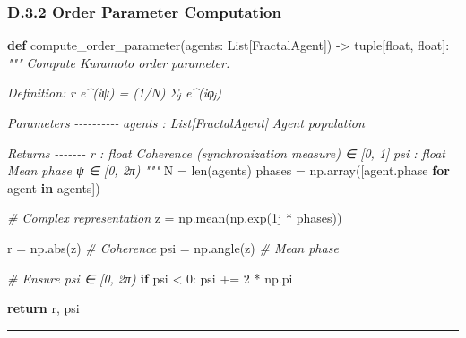\documentclass[
]{article}
\newenvironment{Shaded}{}{}
\newcommand{\BuiltInTok}[1]{\textcolor[rgb]{0.00,0.50,0.00}{#1}}
\newcommand{\CommentTok}[1]{\textcolor[rgb]{0.38,0.63,0.69}{\textit{#1}}}
\newcommand{\ControlFlowTok}[1]{\textcolor[rgb]{0.00,0.44,0.13}{\textbf{#1}}}
\newcommand{\DecValTok}[1]{\textcolor[rgb]{0.25,0.63,0.44}{#1}}
\newcommand{\KeywordTok}[1]{\textcolor[rgb]{0.00,0.44,0.13}{\textbf{#1}}}
\newcommand{\NormalTok}[1]{#1}
\newcommand{\OperatorTok}[1]{\textcolor[rgb]{0.40,0.40,0.40}{#1}}
\newcommand{\OtherTok}[1]{\textcolor[rgb]{0.00,0.44,0.13}{#1}}
\begin{document}
\subsubsection{D.3.2 Order Parameter
Computation}\label{d.3.2-order-parameter-computation}

\begin{Shaded}
\begin{Highlighting}[]
\KeywordTok{def}\NormalTok{ compute\_order\_parameter(agents: List[FractalAgent]) }\OperatorTok{{-}\textgreater{}} \BuiltInTok{tuple}\NormalTok{[}\BuiltInTok{float}\NormalTok{, }\BuiltInTok{float}\NormalTok{]:}
    \CommentTok{"""}
\CommentTok{    Compute Kuramoto order parameter.}

\CommentTok{    Definition:}
\CommentTok{        r e\^{}(iψ) = (1/N) Σⱼ e\^{}(iφⱼ)}

\CommentTok{    Parameters}
\CommentTok{    {-}{-}{-}{-}{-}{-}{-}{-}{-}{-}}
\CommentTok{    agents : List[FractalAgent]}
\CommentTok{        Agent population}

\CommentTok{    Returns}
\CommentTok{    {-}{-}{-}{-}{-}{-}{-}}
\CommentTok{    r : float}
\CommentTok{        Coherence (synchronization measure) ∈ [0, 1]}
\CommentTok{    psi : float}
\CommentTok{        Mean phase ψ ∈ [0, 2π)}
\CommentTok{    """}
\NormalTok{    N }\OperatorTok{=} \BuiltInTok{len}\NormalTok{(agents)}
\NormalTok{    phases }\OperatorTok{=}\NormalTok{ np.array([agent.phase }\ControlFlowTok{for}\NormalTok{ agent }\KeywordTok{in}\NormalTok{ agents])}

    \CommentTok{\# Complex representation}
\NormalTok{    z }\OperatorTok{=}\NormalTok{ np.mean(np.exp(}\OtherTok{1j} \OperatorTok{*}\NormalTok{ phases))}

\NormalTok{    r }\OperatorTok{=}\NormalTok{ np.}\BuiltInTok{abs}\NormalTok{(z)      }\CommentTok{\# Coherence}
\NormalTok{    psi }\OperatorTok{=}\NormalTok{ np.angle(z)  }\CommentTok{\# Mean phase}

    \CommentTok{\# Ensure psi ∈ [0, 2π)}
    \ControlFlowTok{if}\NormalTok{ psi }\OperatorTok{\textless{}} \DecValTok{0}\NormalTok{:}
\NormalTok{        psi }\OperatorTok{+=} \DecValTok{2} \OperatorTok{*}\NormalTok{ np.pi}

    \ControlFlowTok{return}\NormalTok{ r, psi}
\end{Highlighting}
\end{Shaded}

\begin{center}\rule{0.5\linewidth}{0.5pt}\end{center}
\end{document}
